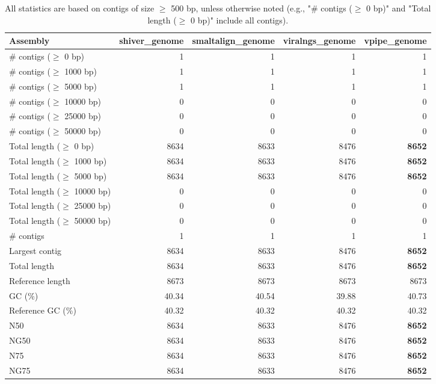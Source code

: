\documentclass[12pt,a4paper]{article}
\begin{document}
\begin{table}[ht]
\begin{center}
\caption{All statistics are based on contigs of size $\geq$ 500 bp, unless otherwise noted (e.g., "\# contigs ($\geq$ 0 bp)" and "Total length ($\geq$ 0 bp)" include all contigs).}
\begin{tabular}{|l*{4}{|r}|}
\hline
Assembly & shiver\_genome & smaltalign\_genome & viralngs\_genome & vpipe\_genome \\ \hline
\# contigs ($\geq$ 0 bp) & 1 & 1 & 1 & 1 \\ \hline
\# contigs ($\geq$ 1000 bp) & 1 & 1 & 1 & 1 \\ \hline
\# contigs ($\geq$ 5000 bp) & 1 & 1 & 1 & 1 \\ \hline
\# contigs ($\geq$ 10000 bp) & 0 & 0 & 0 & 0 \\ \hline
\# contigs ($\geq$ 25000 bp) & 0 & 0 & 0 & 0 \\ \hline
\# contigs ($\geq$ 50000 bp) & 0 & 0 & 0 & 0 \\ \hline
Total length ($\geq$ 0 bp) & 8634 & 8633 & 8476 & {\bf 8652} \\ \hline
Total length ($\geq$ 1000 bp) & 8634 & 8633 & 8476 & {\bf 8652} \\ \hline
Total length ($\geq$ 5000 bp) & 8634 & 8633 & 8476 & {\bf 8652} \\ \hline
Total length ($\geq$ 10000 bp) & 0 & 0 & 0 & 0 \\ \hline
Total length ($\geq$ 25000 bp) & 0 & 0 & 0 & 0 \\ \hline
Total length ($\geq$ 50000 bp) & 0 & 0 & 0 & 0 \\ \hline
\# contigs & 1 & 1 & 1 & 1 \\ \hline
Largest contig & 8634 & 8633 & 8476 & {\bf 8652} \\ \hline
Total length & 8634 & 8633 & 8476 & {\bf 8652} \\ \hline
Reference length & 8673 & 8673 & 8673 & 8673 \\ \hline
GC (\%) & 40.34 & 40.54 & 39.88 & 40.73 \\ \hline
Reference GC (\%) & 40.32 & 40.32 & 40.32 & 40.32 \\ \hline
N50 & 8634 & 8633 & 8476 & {\bf 8652} \\ \hline
NG50 & 8634 & 8633 & 8476 & {\bf 8652} \\ \hline
N75 & 8634 & 8633 & 8476 & {\bf 8652} \\ \hline
NG75 & 8634 & 8633 & 8476 & {\bf 8652} \\ \hline

\end{tabular}
\end{center}
\end{table}
\end{document}
